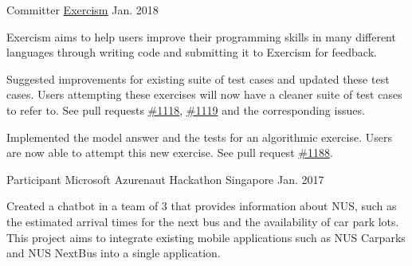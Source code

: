 

\begin{cventries}


  \cventry
    {Committer} %
    {\href{https://github.com/exercism}{Exercism}} %
    {} %
    {Jan. 2018} %
    {
      \begin{cvitems} %
        \item {Exercism aims to help users improve their programming skills in many different languages through writing code and submitting it to Exercism for feedback.}
        \item {Suggested improvements for existing suite of test cases and updated these test cases. Users attempting these exercises will now have a cleaner suite of test cases to refer to. See pull requests \href{https://github.com/exercism/problem-specifications/pull/1118}{\color{teal}\#1118}, \href{https://github.com/exercism/problem-specifications/pull/1119}{\color{teal}\#1119} and the corresponding issues.}
        \item {Implemented the model answer and the tests for an algorithmic exercise. Users are now able to attempt this new exercise. See pull request \href{https://github.com/exercism/java/pull/1188}{\color{teal}\#1188}.}
      \end{cvitems}
    }

  \cventry
    {Participant} %
    {Microsoft Azurenaut Hackathon} %
    {Singapore} %
    {Jan. 2017} %
    {
      \begin{cvitems} %
        \item {Created a chatbot in a team of 3 that provides information about NUS, such as the estimated arrival times for the next bus and the availability of car park lots. This project aims to integrate existing mobile applications such as NUS Carparks and NUS NextBus into a single application.}
      \end{cvitems}
    }
    

\end{cventries}
